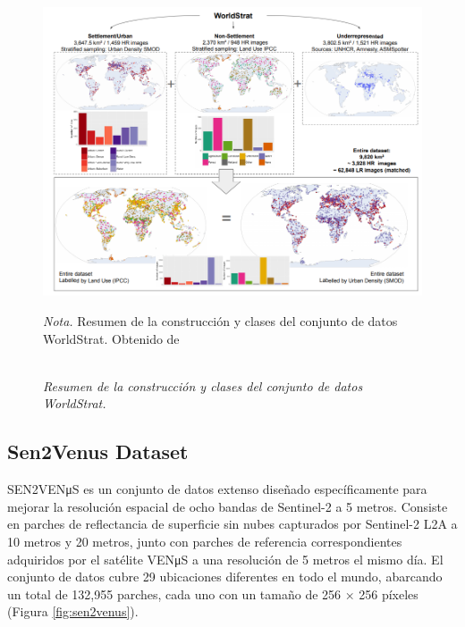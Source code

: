 \begin{figure}[H] 
    \caption{\doublespacing \\ \textit{Resumen de la construcción y clases del conjunto de datos WorldStrat.}} 
    \centering
    \includegraphics[width=1\linewidth]{images/csaybar_fig07.png}
    \begin{justify}
        \textit{Nota.} Resumen de la construcción y clases del conjunto de datos WorldStrat. Obtenido de \textcite{cornebise2022open}
    \end{justify}                    
    \label{fig:worldstrat}
\end{figure}

\subsection{Sen2Venus Dataset}
SEN2VENμS es un conjunto de datos extenso diseñado específicamente para mejorar la resolución espacial de ocho bandas de Sentinel-2 a 5 metros. Consiste en parches de reflectancia de superficie sin nubes capturados por Sentinel-2 L2A a 10 metros y 20 metros, junto con parches de referencia correspondientes adquiridos por el satélite VENμS a una resolución de 5 metros el mismo día. El conjunto de datos cubre 29 ubicaciones diferentes en todo el mundo, abarcando un total de 132,955 parches, cada uno con un tamaño de 256 × 256 píxeles (Figura \ref{fig:sen2venus}).

